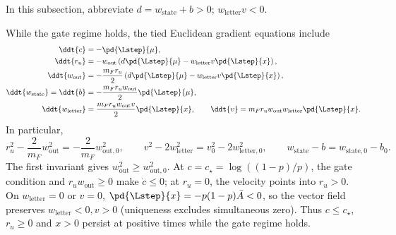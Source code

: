 In this subsection, abbreviate $d=w_{\mathrm{state}}+b>0$; $w_{\mathrm{letter}}v<0$.

While the gate regime holds, the tied Euclidean gradient equations include
\begin{align}
 \ddt{c}&=-\pd{\Lstep}{\mu},\label{eq:lr-factor-u}\\
 \ddt{r_u}&=-w_{\mathrm{out}}\left(d\pd{\Lstep}{\mu}-w_{\mathrm{letter}} v\pd{\Lstep}{x}\right),\\
 \ddt{w_{\mathrm{out}}}&=-\frac{m_F r_u}{2}
 \left(d\pd{\Lstep}{\mu}-w_{\mathrm{letter}} v\pd{\Lstep}{x}\right),\\
 \ddt{w_{\mathrm{state}}}=\ddt{b}&=-\frac{m_F r_uw_{\mathrm{out}}}{2}\pd{\Lstep}{\mu},\\
 \ddt{w_{\mathrm{letter}}}&=\frac{m_F r_uw_{\mathrm{out}} v}{2}\pd{\Lstep}{x},\qquad
 \ddt{v}=m_F r_uw_{\mathrm{out}}w_{\mathrm{letter}}\pd{\Lstep}{x}.
 \label{eq:lr-factor-bv}
\end{align}
In particular,
\begin{equation}\label{eq:lr-factor-invariants}
 r_u^2-\frac{2}{m_F}w_{\mathrm{out}}^2=-\frac{2}{m_F}w_{\mathrm{out},0}^2,
 \qquad
 v^2-2w_{\mathrm{letter}}^2=v_0^2-2w_{\mathrm{letter},0}^2,
 \qquad w_{\mathrm{state}}-b=w_{\mathrm{state},0}-b_0.
\end{equation}
The first invariant gives $w_{\mathrm{out}}^2\ge w_{\mathrm{out},0}^2$.
At $c=c_\star=\log((1-p)/p)$, the gate condition and $r_uw_{\mathrm{out}}\ge0$
make $\dot c\le0$; at $r_u=0$, the velocity points into $r_u>0$.
On $w_{\mathrm{letter}}=0$ or $v=0$,
$\pd{\Lstep}{x}=-p(1-p)\bar A<0$, so the vector field preserves
$w_{\mathrm{letter}}<0,v>0$ (uniqueness excludes simultaneous zero).
Thus $c\le c_\star$, $r_u\ge0$ and $x>0$ persist at positive times
while the gate regime holds.

